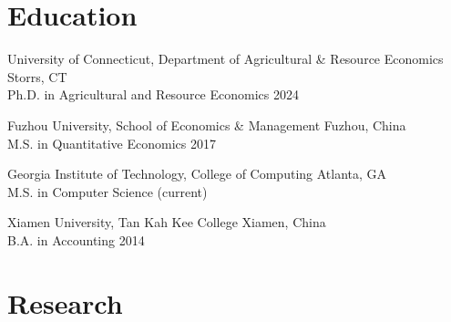 \documentclass[10.5pt,letterpaper]{article}
\renewenvironment{itemize}{
	\begin{list}{}{
			\setlength{\leftmargin}{1.5em}
		}
	}{
	\end{list}
}
\begin{document}
	
	\section*{\textbf{Education}}
	\begin{itemize}
		\item[-] University of Connecticut, Department of Agricultural \& Resource Economics \hfill Storrs, CT \\
		 Ph.D. in Agricultural and Resource Economics  \hfill 2024
		 
		 


		
		\item[-] Fuzhou University, School of Economics \& Management \hfill Fuzhou, China \\
		M.S. in Quantitative Economics \hfill 2017
		
				 
		\item[-] Georgia Institute of Technology, College of Computing \hfill Atlanta, GA \\
		M.S. in Computer Science (current)
		
		
		\item[-] Xiamen University, Tan Kah Kee College \hfill Xiamen, China \\
		B.A. in Accounting \hfill 2014
	\end{itemize}
	
	\section*{\textbf{Research}}
 
 
\end{document}
